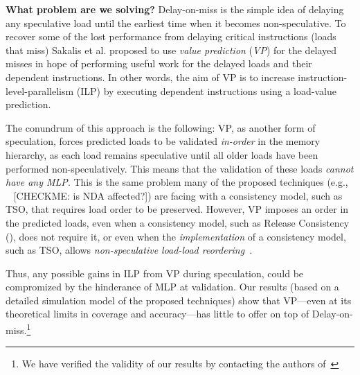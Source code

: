 \noindent \textbf{What problem are we solving?} Delay-on-miss is the simple idea of delaying any speculative load until the earliest time when it becomes non-speculative. 
To recover some of the lost performance from delaying critical instructions (loads that miss) Sakalis et al. proposed to use \emph{value prediction} (\emph{VP}) for the delayed misses in hope of performing useful work for the delayed loads and their dependent instructions. In other words, the aim of VP is to increase instruction-level-parallelism (ILP) by executing dependent instructions using a load-value prediction. 

The conundrum of this approach is the following: VP, as another form of speculation, forces predicted loads to be validated \emph{in-order} in the memory hierarchy, as each load remains speculative until all older loads have been performed non-speculatively. This means that the validation of these loads \emph{cannot have any MLP}. 
This is the same problem many of the proposed techniques (e.g., ~\cite{yan_invisispec:MICRO2018,sakalis2019ghost,sakalis2019efficient,weisse2019nda}{\color{red} [CHECKME: is NDA affected?]}) are facing with a consistency model, such as TSO, that requires load order to be preserved. 
However, VP imposes an order in the predicted loads, even when a consistency model, such as Release Consistency (\rc), does not require it, or even when the \emph{implementation} of a consistency model, such as TSO, allows \emph{non-speculative load-load reordering}~\cite{aros-isca17}.

Thus, any possible gains in ILP from VP during speculation, could be compromized by the hinderance of MLP at validation.
{\color{red} Our results (based on a detailed simulation model of the proposed techniques) show that VP---even at its theoretical limits in coverage and accuracy---has little to offer on top of Delay-on-miss.\footnote{We have verified the validity of our results by contacting the authors of~\cite{sakalis2019efficient}}}

